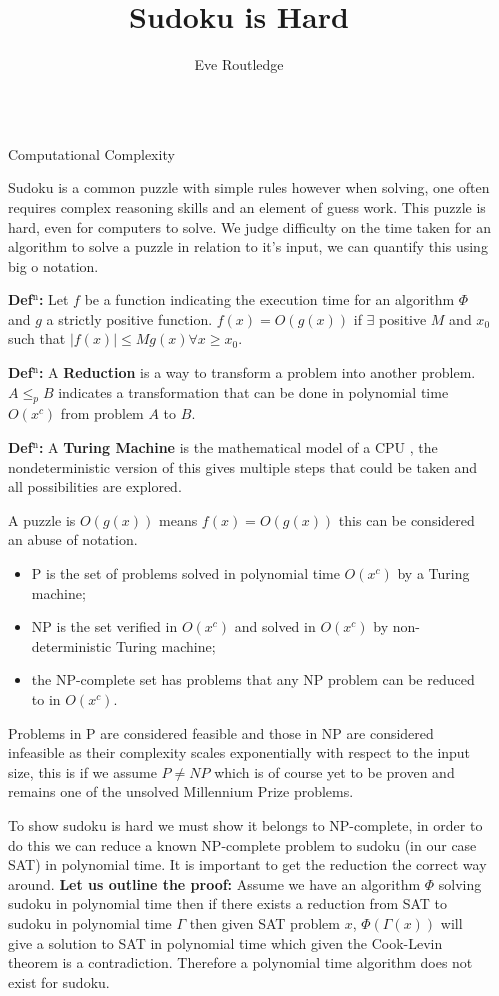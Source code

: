 \documentclass[final]{beamer}
\title{Sudoku is Hard}
\author{Eve Routledge}
\newlength{\sepwidth}
\newlength{\colwidth}
\newcounter{col}
\newcommand{\separatorcolumn}{\begin{column}{\sepwidth}\end{column}}
\begin{document}
\begin{frame}[t]
\begin{columns}[t]
\separatorcolumn

\begin{column}{\colwidth}

  \begin{exampleblock}{Computational Complexity}

Sudoku is a common puzzle with simple rules however when solving, one often requires complex reasoning skills and an element of guess work. This puzzle is hard, even for computers to solve. We judge difficulty on the time taken for an algorithm to solve a puzzle in relation to it's input, we can quantify this using big o notation.

\textbf{Def$^\text{n}$:} Let $f$ be a function indicating the execution time for an algorithm $\Phi$ and $g$ a strictly positive function. $f(x)=O (g(x))$ if $\exists$ positive $ M$ and $x_0$ such that $|f(x)|\leq Mg(x)\forall x\geq x_0$.

\textbf{Def$^\text{n}$:} A \textbf{Reduction} is a way to transform a problem into another problem. $A \leq_p B$ indicates a transformation that can be done in polynomial time $O(x^c)$ from problem $A$ to $B$.

\textbf{Def$^\text{n}$:} A \textbf{Turing Machine} is the mathematical model of a CPU  , the nondeterministic version of this gives multiple steps that could be taken and all possibilities are explored.

A puzzle is $O(g(x))$ means $f(x)=O(g(x))$ this can be considered an abuse of notation.

 \begin{itemize}
	\item{P is the set of problems solved in polynomial time $O(x^c)$ by a Turing machine;} 
	\item{NP is the set verified in $O(x^c)$ and solved in $O(x^c)$ by non-deterministic Turing machine;} 
	\item{the NP-complete set has problems that any NP problem can be reduced to in $O(x^c)$.} 
\end{itemize}
Problems in P are considered feasible and those in NP are considered infeasible as their complexity scales exponentially with respect to the input size, this is if we assume $P\neq NP$ which is of course yet to be proven and remains one of the unsolved Millennium Prize problems.

To show sudoku is hard we must show it belongs to NP-complete, in order to do this we can reduce a known NP-complete problem to sudoku (in our case SAT) in polynomial time. It is important to get the reduction the correct way around. \textbf{Let us outline the proof:} Assume we have an algorithm $\Phi$ solving sudoku in polynomial time then if there exists a reduction from SAT to sudoku in polynomial time $\Gamma$ then given SAT problem $x$, $\Phi(\Gamma(x))$ will give a solution to SAT in polynomial time which given the Cook-Levin theorem is a contradiction. Therefore a polynomial time algorithm does not exist for sudoku.


\end{exampleblock}
\end{column}
\end{columns}
\end{frame}
\end{document}
